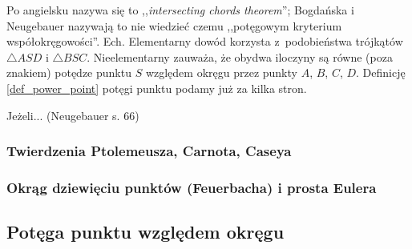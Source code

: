 Po angielsku nazywa się to ,,\emph{intersecting chords theorem}''; Bogdańska i Neugebauer nazywają to nie wiedzieć czemu ,,potęgowym kryterium współokręgowości''.
Ech.
Elementarny dowód korzysta z~podobieństwa trójkątów $\triangle ASD$ i $\triangle BSC$.
Nieelementarny zauważa, że obydwa iloczyny są równe (poza znakiem) potędze punktu $S$ względem okręgu przez punkty $A$, $B$, $C$, $D$.
Definicję \ref{def_power_point} potęgi punktu podamy już za kilka stron.

\begin{proposition}
	Jeżeli... (Neugebauer s. 66)
\end{proposition}

\subsubsection{Twierdzenia Ptolemeusza, Carnota, Caseya}


\subsubsection{Okrąg dziewięciu punktów (Feuerbacha) i prosta Eulera}


\subsection{Potęga punktu względem okręgu}

